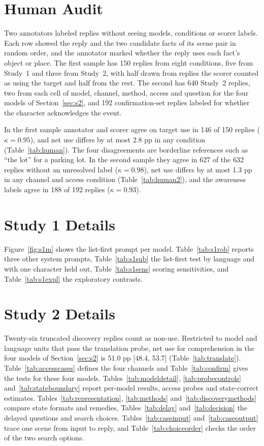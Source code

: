 \documentclass[11pt]{article}
\begin{document}
\section{Human Audit}
\label{app:audit}
Two annotators labeled replies without seeing models, conditions or scorer labels. Each row showed the reply and the two candidate facts of its scene pair in random order, and the annotator marked whether the reply uses each fact's object or place. The first sample has 150 replies from eight conditions, five from Study~1 and three from Study~2, with half drawn from replies the scorer counted as using the target and half from the rest. The second has 640 Study~2 replies, two from each cell of model, channel, method, access and question for the four models of Section~\ref{sec:s2}, and 192 confirmation-set replies labeled for whether the character acknowledges the event.

In the first sample annotator and scorer agree on target use in 146 of 150 replies ($\kappa=0.95$), and net use differs by at most 2.8 pp in any condition (Table~\ref{tab:human}). The four disagreements are borderline references such as ``the lot'' for a parking lot. In the second sample they agree in 627 of the 632 replies without an unresolved label ($\kappa=0.98$), net use differs by at most 1.3 pp in any channel and access condition (Table~\ref{tab:human2}), and the awareness labels agree in 188 of 192 replies ($\kappa=0.93$).

\section{Study 1 Details}
\label{app:s1}
Figure~\ref{fig:s1m} shows the list-first prompt per model. Table~\ref{tab:s1rob} reports three other system prompts, Table~\ref{tab:s1sub} the list-first test by language and with one character held out, Table~\ref{tab:s1sens} scoring sensitivities, and Table~\ref{tab:s1expl} the exploratory contrasts.

\section{Study 2 Details}
\label{app:s2}
Twenty-six truncated discovery replies count as non-use. Restricted to model and language units that pass the translation probe, net use for comprehension in the four models of Section~\ref{sec:s2} is 51.0 pp [48.4, 53.7] (Table~\ref{tab:translate}). Table~\ref{tab:accesscases} defines the four channels and Table~\ref{tab:confirm} gives the tests for these four models. Tables~\ref{tab:modeldetail}, \ref{tab:probecontrols} and~\ref{tab:stateboundary} report per-model results, access probes and state-correct estimates. Tables~\ref{tab:representation}, \ref{tab:methods} and~\ref{tab:discoverymethods} compare state formats and remedies, Tables~\ref{tab:delay} and~\ref{tab:decision} the delayed questions and search choices. Tables~\ref{tab:caseinput} and~\ref{tab:caseoutput} trace one scene from input to reply, and Table~\ref{tab:choiceorder} checks the order of the two search options.
\end{document}
